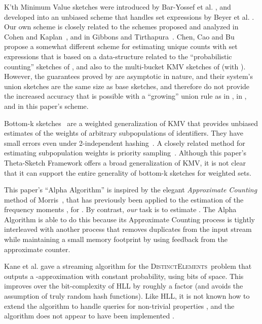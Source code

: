 \documentclass{article}
\newcommand{\DistinctElements}{\textsc{DistinctElements}}
\begin{document}
K'th Minimum Value sketches were introduced by Bar-Yossef et al. \cite{bar2002counting}, and developed into
an unbiased scheme that handles set expressions by Beyer et al. \cite{beyer2009distinct}.
Our own scheme is closely related to the schemes
proposed and analyzed in Cohen and Kaplan~\cite{cohen2009leveraging}, 
and in Gibbons and Tirthapura~\cite{gibbons2001estimating}.
Chen, Cao and Bu~\cite{chen2007simple} propose a somewhat different
scheme for estimating unique counts with set expressions
that is based on a data-structure related to the ``probabilistic counting'' sketches of \cite{flajolet1985probabilistic},
and also to the multi-bucket KMV sketches of \cite{giroire2009order} (with ).
However, the guarantees proved by \cite{chen2007simple} are asymptotic in nature,
and their system's union sketches are the same size as base sketches, and therefore do not provide the increased
accuracy that is possible with a ``growing'' union rule as in \cite{cohen2009leveraging}, in \cite{gibbons2001estimating},
and in this paper's scheme.

Bottom-k sketches~\cite{cohen2007summarizing,cohen2009leveraging} are a weighted generalization
of KMV that provides unbiased estimates of the weights of arbitrary subpopulations of identifiers.
They have small errors even under 2-independent hashing~\cite{thorup2013bottomk}. A closely 
related method for estimating subpopulation weights is priority sampling~\cite{DuffieldLT07}.
Although this paper's Theta-Sketch Framework offers a broad generalization of KMV, 
it is not clear that it can support the entire generality of bottom-k sketches for weighted sets. 



This paper's ``Alpha Algorithm'' is inspired by the elegant {\em Approximate Counting} 
method of Morris~\cite{morris1978counting}, that has previously been
applied to the estimation of the frequency moments , for . 
By contrast, {\em our} task is to estimate . The Alpha Algorithm is
able to do this because its Approximate Counting process is tightly
interleaved with another process that removes duplicates from the
input stream while maintaining a small memory footprint by using
feedback from the approximate counter.

Kane et al. \cite{kane2010optimal} gave a streaming algorithm for the \DistinctElements\ problem
that outputs a -approximation with constant probability, using
 bits of space. 
This improves over the bit-complexity of HLL by roughly a  factor (and avoids the assumption of truly random hash functions). 
Like HLL, it is not known how to extend the algorithm to handle  queries for non-trivial properties , and the algorithm does not appear to 
have been implemented \cite{heule2013hll}. 
\end{document}
